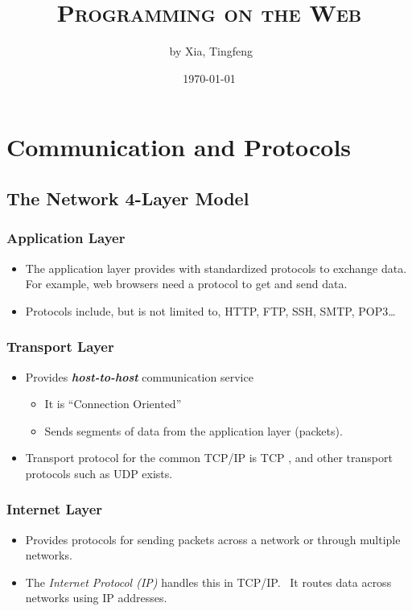 \documentclass[10pt]{article}
\author{\ccLogo \,\,by Xia, Tingfeng}
\title{\textsc{Programming on the Web}}
\date{\today}
\begin{document}
\maketitle
\doclicenseThis
\tableofcontents
\newpage

\section{Communication and Protocols}

\subsection{The Network 4-Layer Model}
\subsubsection{Application Layer}
\begin{itemize}
    \item The application layer provides with standardized protocols to exchange data. For example, web browsers need a protocol to get and send data. 
    \item Protocols include, but is not limited to, HTTP, FTP, SSH, SMTP, POP3\dots
\end{itemize}

\subsubsection{Transport Layer}
\begin{itemize}
    \item Provides \textit{\textbf{host-to-host}} communication service
    \begin{itemize}
        \item It is ``Connection Oriented''
        \item Sends segments of data from the application layer (packets).
    \end{itemize}
    \item \color{Red} Transport protocol for the common TCP/IP is TCP \color{Black}, and other transport protocols such as UDP exists.  
\end{itemize}

\subsubsection{Internet Layer}
\begin{itemize}
    \item Provides protocols for sending packets across a network or through multiple networks.
    \item \color{Red} The \textit{Internet Protocol (IP)} handles this in TCP/IP.\color{Black} ~It routes data across networks using IP addresses. 
\end{itemize}
\end{document}
